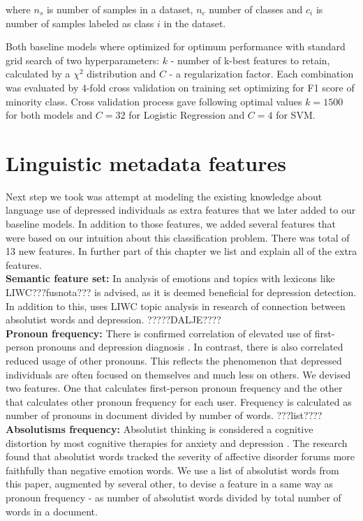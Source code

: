 \documentclass[10pt, a4paper]{article}
\begin{document}
where $n_s$ is number of samples in a dataset, $n_c$ number of classes and $c_i$ is number of samples labeled as class $i$ in the dataset.

Both baseline models where optimized for optimum performance with standard grid search of two hyperparameters: $k$ - number of k-best features to retain, calculated by a ${\chi}^2$ distribution and $C$ - a regularization factor. Each combination was evaluated by 4-fold cross validation on training set optimizing for F1 score of minority class. Cross validation process gave following optimal values $k = 1500$ for both models and $C = 32$ for Logistic Regression and $C = 4$ for SVM.

\section{Linguistic metadata features}

Next step we took was attempt at modeling the existing knowledge \citep{mosaiwi, rudeGortner2004, icpram18, empath2016} about language use of depressed individuals as extra features that we later added to our baseline models. In addition to those features, we added several features that were based on our intuition about this classification problem. There was total of 13 new features. In further part of this chapter we list and explain all of the extra features.
\\

\textbf{Semantic feature set:}
In \citep{LosadaCLEF2017} analysis of emotions and topics with lexicons like LIWC???fusnota??? is advised, as it is deemed beneficial for depression detection. In addition to this, \citep{mosaiwi} uses LIWC topic analysis in research of connection between absolutist words and depression. ?????DALJE????
\\


\textbf{Pronoun frequency:}
There is confirmed correlation of elevated use of first-person pronouns and depression diagnosis \cite{KARMEN201527}. In contrast, there is also correlated reduced usage of other pronouns. This reflects the phenomenon that depressed individuals are often focused on themselves and much less on others. We devised two features. One that calculates first-person pronoun frequency and the other that calculates other pronoun frequency for each user. Frequency is calculated as number of pronouns in document divided by number of words. ???list????
\\

\textbf{Absolutisms frequency:}
Absolutist thinking is considered a cognitive distortion by most cognitive therapies for anxiety and depression \citep{mosaiwi}. The research \cite{mosaiwi} found that absolutist words tracked the severity of affective disorder forums more faithfully than negative emotion words. We use a list of absolutist words from this paper, augmented by several other, to devise a feature in a same way as pronoun frequency - as number of absolutist words divided by total number of words in a document.
\\
\end{document}
